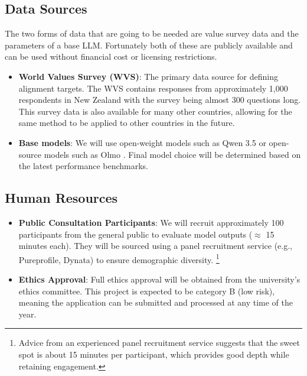 \documentclass[11pt, a4paper]{article}
\begin{document}
\subsection{Data Sources}

The two forms of data that are going to be needed are value survey data and the parameters of a base LLM. Fortunately both of these are publicly available and can be used without financial cost or licensing restrictions.

\begin{itemize}
	\item \textbf{World Values Survey (WVS)}: The primary data source for defining alignment targets. The WVS contains responses from approximately 1,000 respondents in New Zealand with the survey being almost 300 questions long. This survey data is also available for many other countries, allowing for the same method to be applied to other countries in the future.
	\item \textbf{Base models}: We will use open-weight models such as Qwen 3.5\cite{qwen3.5} or open-source models such as Olmo \cite{olmo2025olmo3}. Final model choice will be determined based on the latest performance benchmarks.
\end{itemize}

\subsection{Human Resources}

\begin{itemize}
	\item \textbf{Public Consultation Participants}: We will recruit approximately 100 participants from the general public to evaluate model outputs ($\approx$ 15 minutes each). They will be sourced using a panel recruitment service (e.g., Pureprofile, Dynata) to ensure demographic diversity. \footnote{Advice from an experienced panel recruitment service suggests that the sweet spot is about 15 minutes per participant, which provides good depth while retaining engagement.}
	\item \textbf{Ethics Approval}: Full ethics approval will be obtained from the university's ethics committee. This project is expected to be category B (low risk), meaning the application can be submitted and processed at any time of the year.
\end{itemize}
\end{document}
